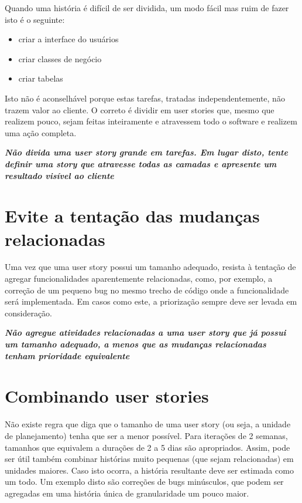 \documentclass[a4paper,abntfigtabnum,noindentfirst]{abnt}
\begin{document}
Quando uma história é difícil de ser dividida, um modo fácil mas ruim de fazer isto é o seguinte:
\begin{itemize}
\item criar a interface do usuários
\item criar classes de negócio
\item criar tabelas
\end{itemize}

Isto não é aconselhável porque estas tarefas, tratadas independentemente, não trazem valor ao cliente. O correto é dividir em user stories que, mesmo que realizem pouco, sejam feitas inteiramente e atravessem todo o software e realizem uma ação completa.

\textit{\textbf{Não divida uma user story grande em tarefas. Em lugar disto, tente definir uma story que atravesse todas as camadas e apresente um resultado visível ao cliente}}


\section{Evite a tentação das mudanças relacionadas}

Uma vez que uma user story possui um tamanho adequado, resista à tentação de agregar funcionalidades aparentemente relacionadas, como, por exemplo, a correção de um pequeno bug no mesmo trecho de código onde a funcionalidade será implementada. Em casos como este, a priorização sempre deve ser levada em consideração.


\textit{\textbf{Não agregue atividades relacionadas a uma user story que já possui um tamanho adequado, a menos que as mudanças relacionadas tenham prioridade equivalente}}


\section{Combinando user stories}

Não existe regra que diga que o tamanho de uma user story (ou seja, a unidade de planejamento) tenha que ser a menor possível. Para iterações de 2 semanas, tamanhos que equivalem a durações de 2 a 5 dias são apropriados. Assim, pode ser útil também combinar histórias muito pequenas (que sejam relacionadas) em unidades maiores. Caso isto ocorra, a história resultante deve ser estimada como um todo. Um exemplo disto são correções de bugs minúsculos, que podem ser agregadas em uma história única de granularidade um pouco maior.
\end{document}
